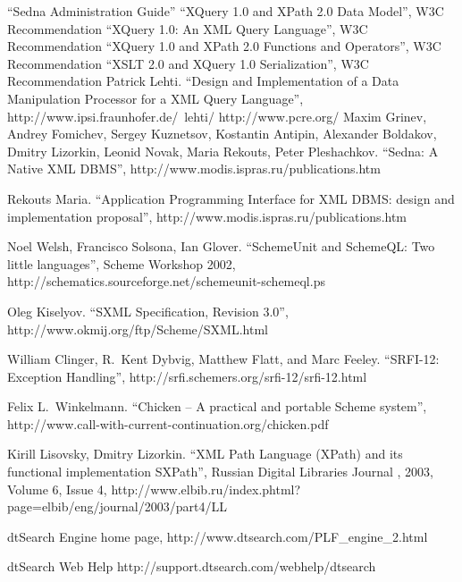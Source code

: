 \documentclass[a4paper,12pt]{article}
\begin{document}
\begin{thebibliography}{9}
 ``Sedna Administration Guide''
 ``XQuery 1.0 and XPath 2.0 Data Model'', W3C Recommendation
 ``XQuery 1.0: An XML Query Language'', W3C Recommendation
 ``XQuery 1.0 and XPath 2.0 Functions and Operators'', W3C Recommendation
 ``XSLT 2.0 and XQuery 1.0 Serialization'', W3C Recommendation
 Patrick Lehti. ``Design and Implementation of a Data Manipulation Processor for a XML Query Language'', http://www.ipsi.fraunhofer.de/~lehti/
 http://www.pcre.org/
Maxim Grinev, Andrey Fomichev, Sergey Kuznetsov, Kostantin Antipin, Alexander Boldakov, Dmitry Lizorkin, Leonid Novak, Maria Rekouts, Peter Pleshachkov. ``Sedna: A Native XML DBMS'', http://www.modis.ispras.ru/publications.htm

 Rekouts Maria. ``Application Programming Interface for XML DBMS: design and implementation proposal'', http://www.modis.ispras.ru/publications.htm

Noel Welsh, Francisco Solsona, Ian Glover.
``SchemeUnit and SchemeQL: Two little languages'',
Scheme Workshop 2002,
http://schematics.sourceforge.net/schemeunit-schemeql.ps

Oleg Kiselyov.
``SXML Specification, Revision 3.0'',
http://www.okmij.org/ftp/Scheme/SXML.html

William Clinger, R.\ Kent Dybvig, Matthew Flatt, and Marc Feeley.
``SRFI-12: Exception Handling'',
http://srfi.schemers.org/srfi-12/srfi-12.html

Felix L.\ Winkelmann.
``Chicken -- A practical and portable Scheme system'',
http://www.call-with-current-continuation.org/chicken.pdf

Kirill Lisovsky, Dmitry Lizorkin.
``XML Path Language (XPath) and its functional implementation SXPath'',
Russian Digital Libraries Journal , 2003, Volume 6, Issue 4,
http://www.elbib.ru/index.phtml?page=elbib/eng/journal/2003/part4/LL

dtSearch Engine home page,
http://www.dtsearch.com/PLF\_engine\_2.html

dtSearch Web Help
http://support.dtsearch.com/webhelp/dtsearch


\end{thebibliography}
\end{document}
